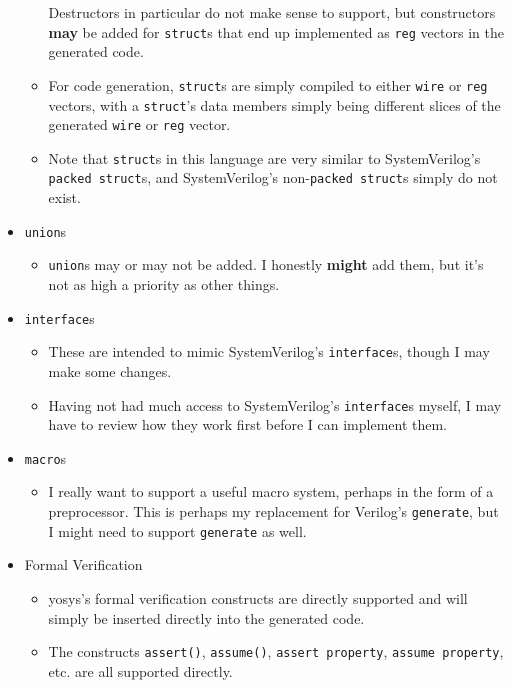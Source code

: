 \documentclass{article}
\begin{document}
\begin{itemize}
\begin{itemize}
			Destructors in particular do not make sense to support, but
			constructors \textbf{may} be added for \texttt{struct}s that
			end up implemented as \texttt{reg} vectors in the generated
			code.
			\item For code generation, \texttt{struct}s are simply compiled
			to either \texttt{wire} or \texttt{reg} vectors, with a
			\texttt{struct}'s data members simply being different slices of
			the generated \texttt{wire} or \texttt{reg} vector.
			\item Note that \texttt{struct}s in this language are very
			similar to SystemVerilog's \texttt{packed struct}s, and
			SystemVerilog's non-\texttt{packed struct}s simply do not
			exist.
			\end{itemize}
		\item \texttt{union}s
			\begin{itemize}
			\item \texttt{union}s may or may not be added.  I honestly
			\textbf{might} add them, but it's not as high a priority as
			other things.
			\end{itemize}
		\item \texttt{interface}s
			\begin{itemize}
			\item These are intended to mimic SystemVerilog's
			\texttt{interface}s, though I may make some changes.
			\item Having not had much access to SystemVerilog's
			\texttt{interface}s myself, I may have to review how they work
			first before I can implement them.
			\end{itemize}
		\item \texttt{macro}s
			\begin{itemize}
			\item I really want to support a useful macro system, perhaps
			in the form of a preprocessor.  This is perhaps my replacement
			for Verilog's \texttt{generate}, but I might need to support
			\texttt{generate} as well.
			\end{itemize}
		\item Formal Verification
			\begin{itemize}
			\item yosys's formal verification constructs are directly
			supported and will simply be inserted directly into the
			generated code.
			\item The constructs \texttt{assert()}, \texttt{assume()},
			\texttt{assert property}, \texttt{assume property}, etc. are
			all supported directly.
			\end{itemize}
		\end{itemize}


\end{document}
